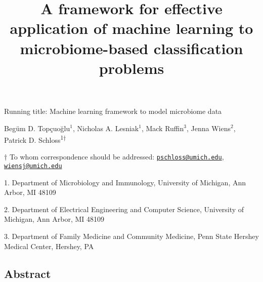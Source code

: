 \documentclass[11pt,]{article}
\title{\textbf{A framework for effective application of machine learning to
microbiome-based classification problems}}
\author{}
\date{\vspace{-2.5em}}
\begin{document}
\maketitle

\vspace{30mm}

Running title: Machine learning framework to model microbiome data

\vspace{20mm}

Begüm D. Topçuoğlu\({^1}\), Nicholas A. Lesniak\({^1}\), Mack
Ruffin\({^3}\), Jenna Wiens\({^2}\), Patrick D.
Schloss\textsuperscript{1\(\dagger\)}

\vspace{30mm}

\(\dagger\) To whom correspondence should be addressed:
\href{mailto:pschloss@umich.edu}{\nolinkurl{pschloss@umich.edu}},
\href{mailto:wiensj@umich.edu}{\nolinkurl{wiensj@umich.edu}}

1. Department of Microbiology and Immunology, University of Michigan,
Ann Arbor, MI 48109

2. Department of Electrical Engineering and Computer Science, University
of Michigan, Ann Arbor, MI 48109

3. Department of Family Medicine and Community Medicine, Penn State
Hershey Medical Center, Hershey, PA

\newpage

\linenumbers

\subsection{Abstract}\label{abstract}
\end{document}
